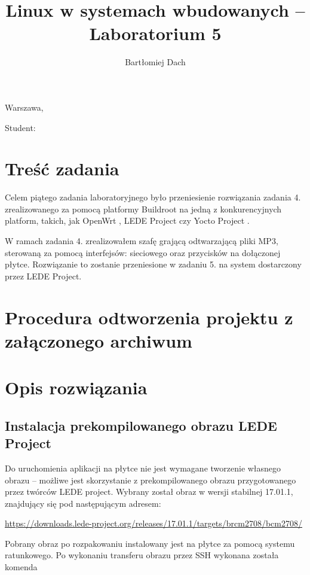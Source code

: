 \documentclass[10pt,a4paper]{article}
\title{Linux w systemach wbudowanych -- Laboratorium 5}
\author{Bartłomiej Dach}
\begin{document}
\makeatletter
\begin{flushright}
	Warszawa, \@date
\end{flushright}
\begin{center}
	\LARGE{\@title}
\end{center}
\vspace{0.25cm}
Student: \@author
\makeatother

\section{Treść zadania}

Celem piątego zadania laboratoryjnego było przeniesienie rozwiązania zadania 4. zrealizowanego
za pomocą platformy Buildroot na jedną z konkurencyjnych platform, takich, jak OpenWrt
\cite{openwrt}, LEDE Project \cite{lede} czy Yocto Project \cite{yocto}.

W ramach zadania 4. zrealizowałem szafę grającą odtwarzającą pliki MP3, sterowaną za pomocą
interfejsów: sieciowego oraz przycisków na dołączonej płytce. Rozwiązanie to zostanie przeniesione
w zadaniu 5. na system dostarczony przez LEDE Project.

\section{Procedura odtworzenia projektu z załączonego archiwum}


\section{Opis rozwiązania}

\subsection{Instalacja prekompilowanego obrazu LEDE Project}

Do uruchomienia aplikacji na płytce nie jest wymagane tworzenie własnego obrazu -- możliwe jest
skorzystanie z prekompilowanego obrazu przygotowanego przez twórców LEDE project. Wybrany został
obraz w wersji stabilnej 17.01.1, znajdujący się pod następującym adresem:

\url{https://downloads.lede-project.org/releases/17.01.1/targets/brcm2708/bcm2708/}

Pobrany obraz po rozpakowaniu instalowany jest na płytce za pomocą systemu ratunkowego. Po
wykonaniu transferu obrazu przez SSH wykonana została komenda
\end{document}
